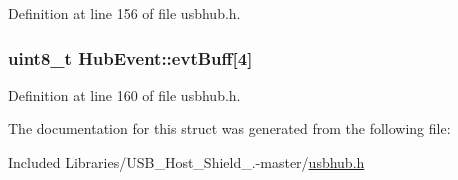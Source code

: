 \-Definition at line 156 of file usbhub.\-h.

\hypertarget{struct_hub_event_a5a8016b368bc8ac993abae3f97b8306f}{
\subsubsection[{evt\-Buff}]{\setlength{\rightskip}{0pt plus 5cm}uint8\-\_\-t {\bf \-Hub\-Event\-::evt\-Buff}\mbox{[}4\mbox{]}}}\label{struct_hub_event_a5a8016b368bc8ac993abae3f97b8306f}


\-Definition at line 160 of file usbhub.\-h.



\-The documentation for this struct was generated from the following file\-:\begin{DoxyCompactItemize}
\item 
\-Included Libraries/\-U\-S\-B\-\_\-\-Host\-\_\-\-Shield\-\_.-\/master/\hyperlink{usbhub_8h}{usbhub.\-h}\end{DoxyCompactItemize}
